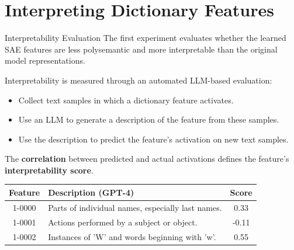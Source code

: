 \section{Interpreting Dictionary Features}

\begin{frame}{Interpretability Evaluation}
  \small
  The first experiment evaluates whether the learned SAE features
  are less polysemantic and more interpretable than the original
  model representations.

  \medskip

  Interpretability is measured through an automated LLM-based evaluation:

  \begin{itemize}
    \item Collect text samples in which a dictionary feature activates.
    \item Use an LLM to generate a description of the feature from these samples.
    \item Use the description to predict the feature's activation on new text samples.
  \end{itemize}

  \medskip

  The \textbf{correlation} between predicted and actual activations
  defines the feature's \textbf{interpretability score}.

  \medskip

  \begin{table}
    \centering
    \footnotesize
    \setlength{\tabcolsep}{3pt}
    \begin{tabular}{c p{6.2cm} c}
      \hline
      \textbf{Feature} & \textbf{Description (GPT-4)} & \textbf{Score} \\
      \hline
      1-0000 & Parts of individual names, especially last names. & 0.33 \\
      1-0001 & Actions performed by a subject or object. & -0.11 \\
      1-0002 & Instances of 'W' and words beginning with 'w'. & 0.55 \\
      \hline
    \end{tabular}
  \end{table}
\end{frame}

